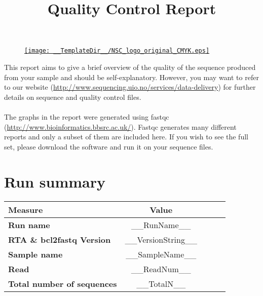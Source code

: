 \documentclass[a4paper, 12pt]{article}
\begin{document}
\begin{figure}
\centering
\href{http://www.sequencing.uio.no/}{\texttt{[image: \_\_TemplateDir\_\_/NSC\_logo\_original\_CMYK.eps]}}
\end{figure}

\title{\bf \Huge Quality Control Report}
\maketitle
This report aims to give a brief overview of the quality of the sequence produced from your sample and should be self-explanatory. However, you may want to refer to our website (\href{http://www.sequencing.uio.no/services/data-delivery}{http://www.sequencing.uio.no/services/data-delivery}) for further details on sequence and quality control files.
\\
\\
The graphs in the report were generated using fastqc (\href{http://www.bioinformatics.bbsrc.ac.uk/projects/fastqc/} {http://www.bioinformatics.bbsrc.ac.uk/}). Fastqc generates many different reports and only a subset of them are included here. If you wish to see the full set, please download the software and run it on your sequence files.

\section{Run summary}
\begin{center}
\begin{table}[H]
\centering
\begin{tabular}{lclcl}
\toprule
{\bf Measure} &{\bf Value}\\
\midrule
{\bf Run name} & __RunName__\\
{\bf RTA \& bcl2fastq Version} & __VersionString__\\
{\bf Sample name} & __SampleName__ \\
{\bf Read} & __ReadNum__ \\
{\bf Total number of sequences} & __TotalN__\\
\bottomrule
\end{tabular}
\end{table}
\end{center}
\end{document}
